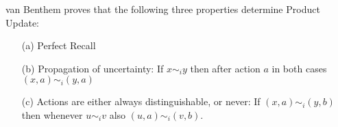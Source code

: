 van Benthem proves that the following three properties determine Product Update:
\begin{enumerate}
\item[(a)] Perfect Recall
\item[(b)] Propagation of uncertainty: If $x\sim_i y$ then after action $a$ in both cases $(x,a)\sim_i (y,a)$
\item[(c)] Actions are either always distinguishable, or never: If $(x,a)\sim_i (y,b)$ then whenever $u\sim_i v$ also $(u,a)\sim_i (v,b)$.
\end{enumerate}